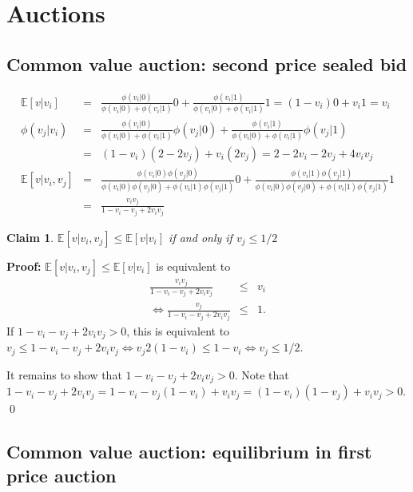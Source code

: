 \documentclass[a4paper,11pt]{article}
\newtheorem{claim}{Claim}
\begin{document}
\section{Auctions}
\label{sec:auctions}

\subsection{Common value auction: second price sealed bid}
\label{sec:comm-value-auct}

\begin{eqnarray*}
\mathbb{E}[v|v_i]&=&\frac{\phi(v_i|0)}{\phi(v_i|0)+\phi(v_i|1)}0+\frac{\phi(v_i|1)}{\phi(v_i|0)+\phi(v_i|1)}1=(1-v_i)0+v_i1=v_i\\
 \phi(v_j|v_i)&=&\frac{\phi(v_i|0)}{\phi(v_i|0)+\phi(v_i|1)}\phi(v_j|0)+\frac{\phi(v_i|1)}{\phi(v_i|0)+\phi(v_i|1)}\phi(v_j|1)\\ &=&(1-v_i)(2-2v_j)+v_i(2v_j) =2-2v_i-2v_j+4v_iv_j\\
\mathbb{E}[v|v_i,v_j]&=&\frac{\phi(v_i|0)\phi(v_j|0)}{\phi(v_i|0)\phi(v_j|0)+\phi(v_i|1)\phi(v_j|1)}0+\frac{\phi(v_i|1)\phi(v_j|1)}{\phi(v_i|0)\phi(v_j|0)+\phi(v_i|1)\phi(v_j|1)}1\\ &=&\frac{v_iv_j}{1-v_i-v_j+2v_iv_j}
\end{eqnarray*}

\begin{claim}
  $\mathbb{E}[v|v_i,v_j]\leq\mathbb{E}[v|v_i]$ if and only if $v_j\leq 1/2$ 
\end{claim}
\textbf{Proof: }$\mathbb{E}[v|v_i,v_j]\leq\mathbb{E}[v|v_i]$ is equivalent to
\begin{eqnarray*}
  \frac{v_iv_j}{1-v_i-v_j+2v_iv_j}&\leq& v_i\\
  \Leftrightarrow \frac{v_j}{1-v_i-v_j+2v_iv_j}&\leq& 1.
\end{eqnarray*}
If $1-v_i-v_j+2v_iv_j>0$, this is equivalent to $v_j\leq1-v_i-v_j+2v_iv_j\Leftrightarrow v_j2 (1-v_i)\leq 1-v_i\Leftrightarrow v_j\leq 1/2$.

It remains to show that $1-v_i-v_j+2v_iv_j>0$. Note that $1-v_i-v_j+2v_iv_j=1-v_i-v_j(1-v_i)+v_iv_j=(1-v_i)(1-v_j)+v_iv_j>0$.
\qed

\subsection{Common value auction: equilibrium in first price auction}
\label{sec:comm-value-auct-1}
\end{document}

